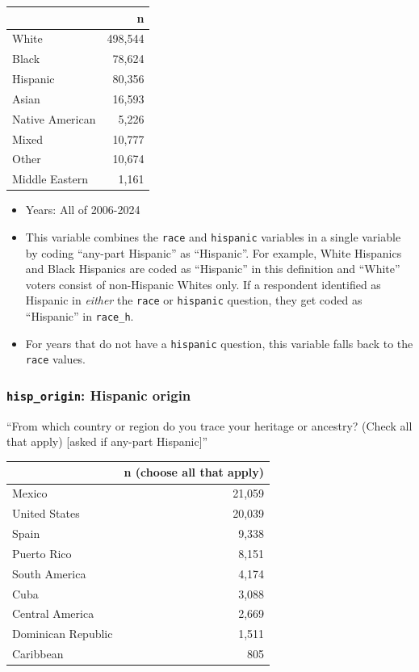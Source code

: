 \documentclass[10pt,article,oneside]{memoir}
\begin{document}
\begin{table}[H]
\centering
\begin{tabular}[t]{lr}
\toprule
 & n\\
\midrule
White & 498,544\\
Black & 78,624\\
Hispanic & 80,356\\
Asian & 16,593\\
Native American & 5,226\\
Mixed & 10,777\\
Other & 10,674\\
Middle Eastern & 1,161\\
\bottomrule
\end{tabular}
\end{table}

\begin{itemize}
\tightlist
\item
  Years: All of 2006-2024
\item
  This variable combines the \texttt{race} and \texttt{hispanic}
  variables in a single variable by coding ``any-part Hispanic'' as
  ``Hispanic''. For example, White Hispanics and Black Hispanics are
  coded as ``Hispanic'' in this definition and ``White'' voters consist
  of non-Hispanic Whites only. If a respondent identified as Hispanic in
  \emph{either} the \texttt{race} or \texttt{hispanic} question, they
  get coded as ``Hispanic'' in \texttt{race\_h}.
\item
  For years that do not have a \texttt{hispanic} question, this variable
  falls back to the \texttt{race} values.
\end{itemize}

\subsubsection{\texorpdfstring{\texttt{hisp\_origin}: Hispanic
origin}{hisp\_origin: Hispanic origin}}\label{hisp_origin-hispanic-origin}

``From which country or region do you trace your heritage or ancestry?
(Check all that apply) {[}asked if any-part Hispanic{]}''

\begin{table}[H]
\centering
\begin{tabular}[t]{lr}
\toprule
 & n (choose all that apply)\\
\midrule
Mexico & 21,059\\
United States & 20,039\\
Spain & 9,338\\
Puerto Rico & 8,151\\
South America & 4,174\\
Cuba & 3,088\\
Central America & 2,669\\
Dominican Republic & 1,511\\
Caribbean & 805\\
\bottomrule
\end{tabular}
\end{table}
\end{document}
